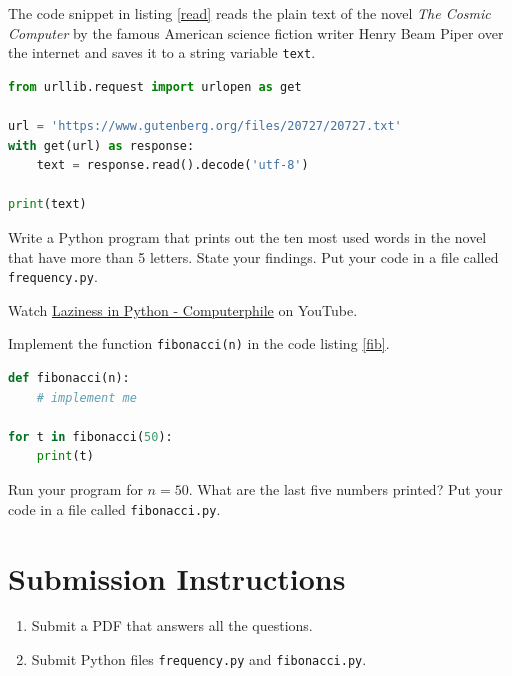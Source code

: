 \documentclass{homework}
\begin{document}
\question The code snippet in listing \ref{read} reads the plain text of the novel \textit{The Cosmic Computer} by the famous American science fiction writer Henry Beam Piper over the internet and saves it to a string variable \texttt{text}.

\begin{lstlisting}[language=python, label=read, caption={A Python program to download the text of the \textit{The Cosmic Computer} by Piper.}]
from urllib.request import urlopen as get

url = 'https://www.gutenberg.org/files/20727/20727.txt'
with get(url) as response:
    text = response.read().decode('utf-8')

print(text)
\end{lstlisting}

Write a Python program that prints out the ten most used words in the novel that have more than 5 letters. State your findings. Put your code in a file called \texttt{frequency.py}.

\question Watch \href{https://www.youtube.com/watch?v=5jwV3zxXc8E}{Laziness in Python - Computerphile} on YouTube.

Implement the function \texttt{fibonacci(n)} in the code listing \ref{fib}.


\begin{lstlisting}[language=python, label=fib, caption={A Python 3 program to print out the first $n \geq 0$ Fibonacci numbers.}]
def fibonacci(n):
    # implement me

for t in fibonacci(50):
    print(t)
\end{lstlisting}

Run your program for $n=50$. What are the last five numbers printed? Put your code in a file called \texttt{fibonacci.py}.

\section*{Submission Instructions}

\begin{enumerate}
  \item Submit a PDF that answers all the questions.
  \item Submit Python files \eg \texttt{frequency.py} and \texttt{fibonacci.py}.
\end{enumerate}
\end{document}
